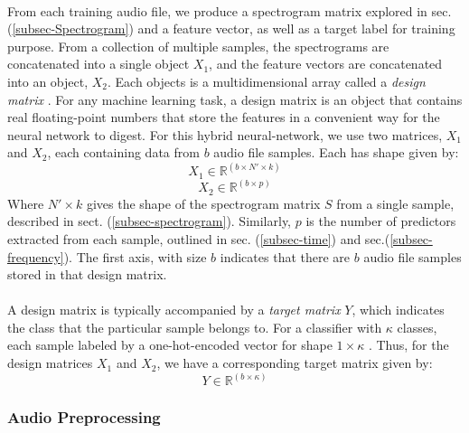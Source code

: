 \documentclass[12pt,letterpaper]{article}
\begin{document}
\paragraph*{}From each training audio file, we produce a spectrogram matrix explored in sec. (\ref{subsec-Spectrogram}) and a feature vector, as well as a target label for training purpose. From a collection of multiple samples, the spectrograms are concatenated into a single object $X_1$, and the feature vectors are concatenated into an object, $X_2$. Each objects is a multidimensional array called a \textit{design matrix} \cite{Geron,Goodfellow,Loy,Zerizel}. For any machine learning task, a  design matrix is an object that contains real floating-point numbers that store the features in a convenient way for the neural network to digest. For this hybrid neural-network, we use two matrices, $X_1$ and $X_2$, each containing data from $b$ audio file samples. Each has shape given by:
\begin{equation}
\label{eqn-X1Shape}
X_1 \in \mathbb{R}^{(b \times N' \times k)}
\end{equation}
\begin{equation}
\label{eqn-X2Shape}
X_2 \in \mathbb{R}^{(b \times p)}
\end{equation}
Where $N' \times k$ gives the shape of the spectrogram matrix $S$ from a single sample, described in sect. (\ref{subsec-spectrogram}). Similarly, $p$ is the number of predictors extracted from each sample, outlined in sec. (\ref{subsec-time}) and sec.(\ref{subsec-frequency}). The first axis, with size $b$ indicates that there are $b$ audio file samples stored in that design matrix. 

\paragraph*{}A design matrix is typically accompanied by a \textit{target matrix} $Y$, which indicates the class that the particular sample belongs to. For a classifier with $\kappa$ classes, each sample labeled by a one-hot-encoded vector for shape $1 \times \kappa$ \cite{Tensorflow,Loy}. Thus, for the design matrices $X_1$ and $X_2$, we have a corresponding target matrix given by:
\begin{equation}
\label{eqn-YShape}
Y \in \mathbb{R}^{(b \times \kappa)}
\end{equation}


\subsubsection{Audio Preprocessing}
\label{subsubsec-Preprocessing}
\end{document}
